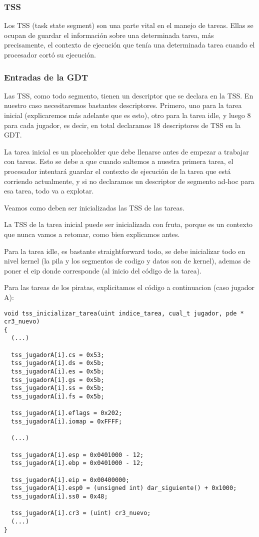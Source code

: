 

\subsubsection*{TSS}

Los TSS (task state segment) son una parte vital en el manejo de tareas. Ellas se ocupan de guardar el información sobre una determinada tarea, más precisamente, el contexto de ejecución que tenía una determinada tarea cuando el procesador cortó su ejecución.

\subsubsection*{Entradas de la GDT}

Las TSS, como todo segmento, tienen un descriptor que se declara en la TSS. En nuestro caso necesitaremos bastantes descriptores. Primero, uno para la tarea inicial (explicaremos más adelante que es esto), otro para la tarea idle, y luego 8 para cada jugador, es decir, en total declaramos 18 descriptores de TSS en la GDT.

La tarea inicial es un placeholder que debe llenarse antes de empezar a trabajar con tareas. Esto se debe a que cuando saltemos a nuestra primera tarea, el procesador intentará guardar el contexto de ejecución de la tarea que está corriendo actualmente, y si no declaramos un descriptor de segmento ad-hoc para esa tarea, todo va a explotar.

Veamos como deben ser inicializadas las TSS de las tareas.

La TSS de la tarea inicial puede ser inicializada con fruta, porque es un contexto que nunca vamos a retomar, como bien explicamos antes.

Para la tarea idle, es bastante straightforward todo, se debe inicializar todo en nivel kernel (la pila y los segmentos de codigo y datos son de kernel), ademas de poner el eip donde corresponde (al inicio del código de la tarea).

Para las tareas de los piratas, explicitamos el código a continuacion (caso jugador A):

\begin{lstlisting}
void tss_inicializar_tarea(uint indice_tarea, cual_t jugador, pde * cr3_nuevo)
{
  (...)

  tss_jugadorA[i].cs = 0x53;
  tss_jugadorA[i].ds = 0x5b;
  tss_jugadorA[i].es = 0x5b;
  tss_jugadorA[i].gs = 0x5b;
  tss_jugadorA[i].ss = 0x5b;
  tss_jugadorA[i].fs = 0x5b;

  tss_jugadorA[i].eflags = 0x202;
  tss_jugadorA[i].iomap = 0xFFFF;

  (...)  

  tss_jugadorA[i].esp = 0x0401000 - 12; 
  tss_jugadorA[i].ebp = 0x0401000 - 12; 

  tss_jugadorA[i].eip = 0x00400000;
  tss_jugadorA[i].esp0 = (unsigned int) dar_siguiente() + 0x1000;
  tss_jugadorA[i].ss0 = 0x48;  

  tss_jugadorA[i].cr3 = (uint) cr3_nuevo;
  (...) 
}
\end{lstlisting}



